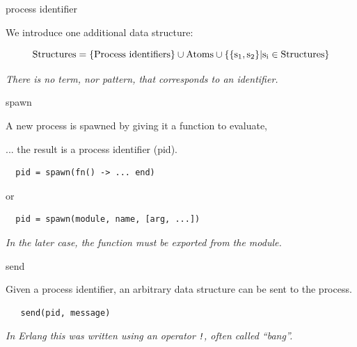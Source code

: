 \begin{frame}{process identifier}

We introduce one additional data structure:
\pause\vspace{10pt}

$${\rm Structures} = \{\rm Process\ identifiers\} \cup {\rm Atoms} \cup \{\{s_1, s_2\} | s_i \in {\rm Structures}\}$$

\pause\vspace{20pt} 
{\em There is no term, nor pattern, that corresponds to an identifier.}
\end{frame}

\begin{frame}[fragile]{spawn}

  A new process is spawned by giving it a function to evaluate, \pause
  
  \vspace{10pt}\hspace{40pt}... the result is a process identifier (pid).

\pause\vspace{20pt}
\begin{verbatim}
  pid = spawn(fn() -> ... end)
\end{verbatim}
\pause\vspace{10pt}
or
\pause\vspace{10pt}
\begin{verbatim}
  pid = spawn(module, name, [arg, ...])
\end{verbatim}
\pause\vspace{10pt}
{\em In the later case, the function must be exported from the module.}

\end{frame}

\begin{frame}[fragile]{send}

Given a process identifier, an arbitrary data structure can be sent to the process.

\pause\vspace{10pt}

\begin{verbatim}
   send(pid, message)
\end{verbatim}

\pause\vspace{20pt}
{\em In Erlang this was written using an operator {\tt !},  often called ``bang''.}

\end{frame}

